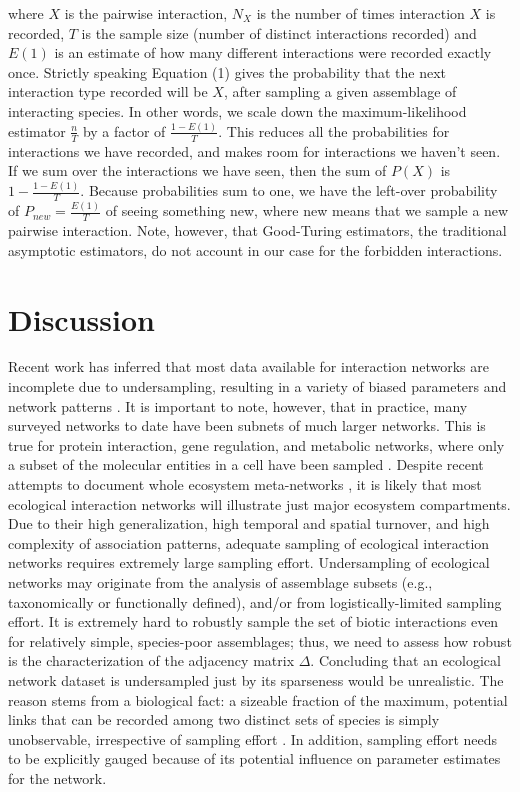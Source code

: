 \documentclass[12pt]{article}
\begin{document}
where $X$ is the pairwise interaction, $N_X$ is the number of times interaction $X$ is recorded, $T$ is the sample size (number of distinct interactions recorded) and $E(1)$ is an estimate of how many different interactions were recorded exactly once. Strictly speaking Equation (1) gives the probability that the next interaction type recorded will be $X$, after sampling a given assemblage of interacting species. In other words, we scale down the maximum-likelihood estimator $\frac{n}{T}$ by a factor of $\frac{1-E(1)}{T}$. This reduces all the probabilities for interactions we have recorded, and makes room for interactions we haven’t seen. If we sum over the interactions we have seen, then the sum of $P(X)$ is $1-\frac{1-E(1)}{T}$. Because probabilities sum to one, we have the left-over probability of
$P_{new}= \frac{E(1)}{T}$ of seeing something new, where new means that we sample a new pairwise interaction. Note, however, that Good-Turing estimators, the traditional asymptotic estimators, do not account in our case for the forbidden interactions. 

\section*{Discussion}
\label{discussion}
Recent work has inferred that most data available for interaction networks are incomplete due to undersampling, resulting in a variety of biased parameters and network patterns \citep{Chacoff:2012}. It is important to note, however, that in practice, many surveyed networks to date have been subnets of much larger networks. This is true for protein interaction, gene regulation, and metabolic networks, where only a subset of the molecular entities in a cell have been sampled \citep{Stumpf:2005tn}. Despite recent attempts to document whole ecosystem meta-networks \citep{Pocock:2012ep}, it is likely that most ecological interaction networks will illustrate just major ecosystem compartments. Due to their high generalization, high temporal and spatial turnover, and high complexity of association patterns, adequate sampling of ecological interaction networks requires extremely large sampling effort. Undersampling of ecological networks may originate from the analysis of assemblage subsets (e.g., taxonomically or functionally defined), and\slash or from logistically-limited sampling effort. It is extremely hard to robustly sample the set of biotic interactions even for relatively simple, species-poor assemblages; thus, we need to assess how robust is the characterization of the adjacency matrix $\Delta$. Concluding that an ecological network dataset is undersampled just by its sparseness would be unrealistic. The reason stems from a biological fact: a sizeable fraction of the maximum, potential links that can be recorded among two distinct sets of species is simply unobservable, irrespective of sampling effort \citep{E31/2562}. In addition, sampling effort needs to be explicitly gauged because of its potential influence on parameter estimates for the network. 
\end{document}

